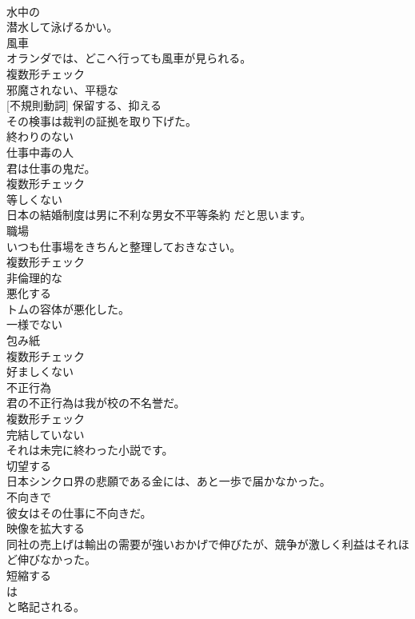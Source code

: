 \documentclass[8pt]{extreport}
\begin{document}
\begin{CJK}{UTF8}{min}
\\	[形容詞]	水中の	
\\	潜水して泳げるかい。	
\\	[名詞]	風車	
\\	オランダでは、どこへ行っても風車が見られる。	
\\	複数形チェック
\\	[形容詞]	邪魔されない、平穏な	
\\	[動詞] [不規則動詞]	保留する、抑える	
\\	その検事は裁判の証拠を取り下げた。	
\\	[形容詞]	終わりのない	
\\	[名詞]	仕事中毒の人	
\\	君は仕事の鬼だ。	
\\	複数形チェック
\\	[形容詞]	等しくない	
\\	日本の結婚制度は男に不利な男女不平等条約 だと思います。	
\\	[名詞]	職場	
\\	いつも仕事場をきちんと整理しておきなさい。	
\\	複数形チェック
\\	[形容詞]	非倫理的な	
\\	[動詞]	悪化する	
\\	トムの容体が悪化した。	
\\	[形容詞]	一様でない	
\\	[名詞]	包み紙	
\\	複数形チェック
\\	[形容詞]	好ましくない	
\\	[名詞]	不正行為	
\\	君の不正行為は我が校の不名誉だ。	
\\	複数形チェック
\\	[形容詞]	完結していない	
\\	それは未完に終わった小説です。	
\\	[動詞]	切望する	
\\	日本シンクロ界の悲願である金には、あと一歩で届かなかった。	
\\	[形容詞]	不向きで	
\\	彼女はその仕事に不向きだ。	
\\	[動詞]	映像を拡大する	
\\	同社の売上げは輸出の需要が強いおかげで伸びたが、競争が激しく利益はそれほど伸びなかった。	
\\	[動詞]	短縮する	
\\	は
\\	と略記される。	

\end{CJK}
\end{document}
